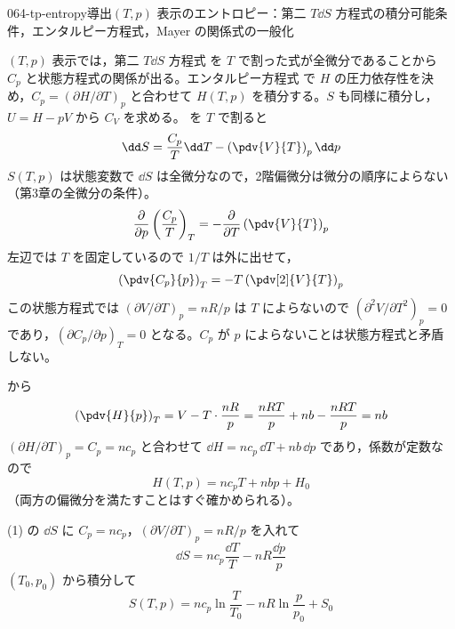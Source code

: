 \documentclass[uplatex,dvipdfmx,a4paper,11pt]{jsarticle}
\begin{document}
\begin{mondai}{064-tp-entropy}{導出}{$(T,p)$ 表示のエントロピー：第二 $T\dd S$ 方程式の積分可能条件，エンタルピー方程式，Mayer の関係式の一般化}
\begin{kizuki}
\end{kizuki}
\begin{tadashii}
\houshin $(T,p)$ 表示では，第二 $T\dd S$ 方程式  を $T$ で割った式が全微分であることから $C_{p}$ と状態方程式の関係が出る。エンタルピー方程式  で $H$ の圧力依存性を決め，$C_{p} = (\partial H/\partial T)_{p}$ と合わせて $H(T,p)$ を積分する。$S$ も同様に積分し，$U = H - pV$ から $C_{V}$ を求める。
\keisan {}  を $T$ で割ると
\[ \dd S = \frac{C_{p}}{T}\dd T - \left(\pdv{V}{T}\right)_{p}\dd p \]
$S(T,p)$ は状態変数で $\dd S$ は全微分なので，2階偏微分は微分の順序によらない（第3章の全微分の条件）。
\[ \frac{\partial}{\partial p}\left(\frac{C_{p}}{T}\right)_{T} = -\frac{\partial}{\partial T}\left(\pdv{V}{T}\right)_{p} \]
左辺では $T$ を固定しているので $1/T$ は外に出せて，
\[ \left(\pdv{C_{p}}{p}\right)_{T} = -T\left(\pdv[2]{V}{T}\right)_{p} \]
この状態方程式では $(\partial V/\partial T)_{p} = nR/p$ は $T$ によらないので $(\partial^{2}V/\partial T^{2})_{p} = 0$ であり，$(\partial C_{p}/\partial p)_{T} = 0$ となる。$C_{p}$ が $p$ によらないことは状態方程式と矛盾しない。

  から
\[ \left(\pdv{H}{p}\right)_{T} = V - T\cdot\frac{nR}{p} = \frac{nRT}{p} + nb - \frac{nRT}{p} = nb \]
$(\partial H/\partial T)_{p} = C_{p} = nc_{p}$ と合わせて $\dd H = nc_{p}\,\dd T + nb\,\dd p$ であり，係数が定数なので
\[ H(T,p) = nc_{p}T + nbp + H_{0} \]
（両方の偏微分を満たすことはすぐ確かめられる）。

 (1) の $\dd S$ に $C_{p} = nc_{p}$，$(\partial V/\partial T)_{p} = nR/p$ を入れて
\[ \dd S = nc_{p}\frac{\dd T}{T} - nR\frac{\dd p}{p} \]
$(T_{0},p_{0})$ から積分して
\[ S(T,p) = nc_{p}\ln\frac{T}{T_{0}} - nR\ln\frac{p}{p_{0}} + S_{0} \]


\end{tadashii}
\end{mondai}
\end{document}
